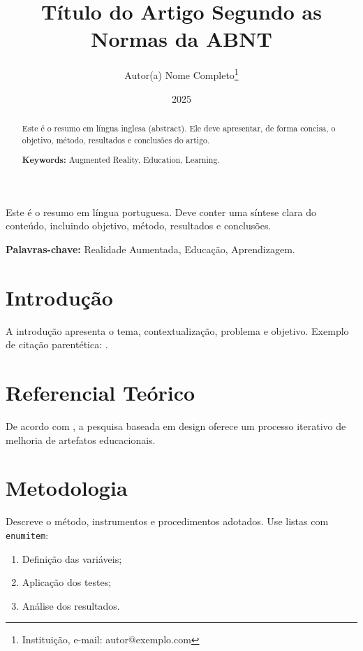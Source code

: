 \documentclass[12pt,oneside]{abntex2}
\title{Título do Artigo Segundo as Normas da ABNT}
\author{Autor(a) Nome Completo\thanks{Instituição, e-mail: autor@exemplo.com}}
\date{2025}
\begin{document}
\maketitle

\begin{abstract}
Este é o resumo em língua inglesa (abstract). Ele deve apresentar, de forma concisa, o objetivo, método, resultados e conclusões do artigo.

\textbf{Keywords:} Augmented Reality, Education, Learning.
\end{abstract}

\begin{resumo}
Este é o resumo em língua portuguesa. Deve conter uma síntese clara do conteúdo, incluindo objetivo, método, resultados e conclusões.

\textbf{Palavras-chave:} Realidade Aumentada, Educação, Aprendizagem.
\end{resumo}

\section{Introdução}
A introdução apresenta o tema, contextualização, problema e objetivo.  
Exemplo de citação parentética: \cite{azumaRecentAdvancesAugmentedReality2001}.  

\section{Referencial Teórico}
De acordo com \cite{pimentelDesignScienceResearch2020}, a pesquisa baseada em design oferece um processo iterativo de melhoria de artefatos educacionais.

\section{Metodologia}
Descreve o método, instrumentos e procedimentos adotados.  
Use listas com \texttt{enumitem}:
\begin{enumerate}[label=\alph*)]
  \item Definição das variáveis;
  \item Aplicação dos testes;
  \item Análise dos resultados.
\end{enumerate}
\end{document}
